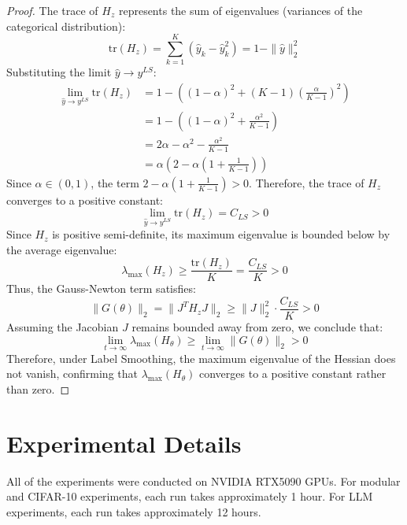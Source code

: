 \documentclass{article}
\theoremstyle{plain}
\theoremstyle{definition}
\theoremstyle{remark}
\begin{document}
\begin{proof}
    The trace of $H_z$ represents the sum of eigenvalues (variances of the categorical distribution):
    \begin{equation}
    \text{tr}(H_z) = \sum_{k=1}^K (\hat{y}_k - \hat{y}_k^2) = 1 - \|\hat{y}\|_2^2
    \end{equation}
    Substituting the limit $\hat{y} \to y^{LS}$:
    \begin{align}
    \lim_{\hat{y} \to y^{LS}} \text{tr}(H_z) &= 1 - \left( (1-\alpha)^2 + (K-1) \left(\frac{\alpha}{K-1}\right)^2 \right) \\
    &= 1 - \left( (1-\alpha)^2 + \frac{\alpha^2}{K-1} \right) \\
    &= 2\alpha - \alpha^2 - \frac{\alpha^2}{K-1} \\
    &= \alpha \left( 2 - \alpha \left(1 + \frac{1}{K-1}\right) \right)
    \end{align}
    Since $\alpha \in (0, 1)$, the term $2 - \alpha \left(1 + \frac{1}{K-1}\right) > 0$. 
    Therefore, the trace of $H_z$ converges to a positive constant:
    \begin{equation}
    \lim_{\hat{y} \to y^{LS}} \text{tr}(H_z) = C_{LS} > 0
    \end{equation}
    Since $H_z$ is positive semi-definite, its maximum eigenvalue is bounded below by the average eigenvalue:
    \begin{equation}
    \lambda_{\max}(H_z) \geq \frac{\text{tr}(H_z)}{K} = \frac{C_{LS}}{K} > 0
    \end{equation}
    Thus, the Gauss-Newton term satisfies:
    \begin{equation}
    \|G(\theta)\|_2 = \|J^T H_z J\|_2 \geq \|J\|_2^2 \cdot \frac{C_{LS}}{K} > 0
    \end{equation}
    Assuming the Jacobian $J$ remains bounded away from zero, we conclude that:
    \begin{equation}
    \lim_{t \to \infty} \lambda_{\max}(H_\theta) \geq \lim_{t \to \infty} \|G(\theta)\|_2 > 0
    \end{equation}
    Therefore, under Label Smoothing, the maximum eigenvalue of the Hessian does not vanish, 
    confirming that $\lambda_{\max}(H_\theta)$ converges to a positive constant rather than zero.
\end{proof}


\section{Experimental Details}
All of the experiments were conducted on NVIDIA RTX5090 GPUs. For modular and CIFAR-10 experiments, each run takes approximately 1 hour. For LLM experiments, each run takes approximately 12 hours.
\label{app:exp_details}
\end{document}
